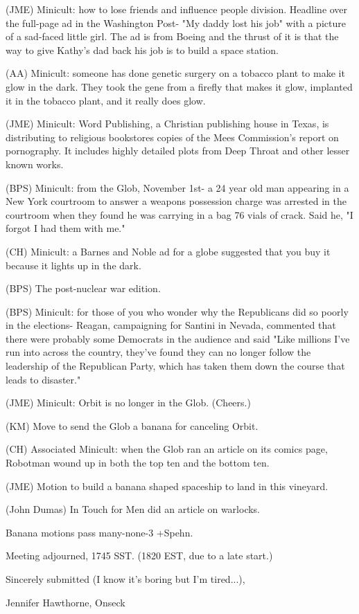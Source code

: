 \documentclass[12pt]{article}
\begin{document}
(JME) Minicult: how to lose friends and influence people division. Headline over the full-page ad in the Washington Post- "My daddy lost his job" with a picture of a sad-faced little girl. The ad is from Boeing and the thrust of it is that the way to give Kathy's dad back his job is to build a space station.

(AA) Minicult: someone has done genetic surgery on a tobacco plant to make it glow in the dark. They took the gene from a firefly that makes it glow, implanted it in the tobacco plant, and it really does glow.

(JME) Minicult: Word Publishing, a Christian publishing house in Texas, is distributing to religious bookstores copies of the Mees Commission's report on pornography. It includes highly detailed plots from Deep Throat and other lesser known works.

(BPS) Minicult: from the Glob, November 1st- a 24 year old man appearing in a New York courtroom to answer a weapons possession charge was arrested in the courtroom when they found he was carrying in a bag 76 vials of crack. Said he, "I forgot I had them with me."

(CH) Minicult: a Barnes and Noble ad for a globe suggested that you buy it because it lights up in the dark.

(BPS) The post-nuclear war edition.

(BPS) Minicult: for those of you who wonder why the Republicans did so poorly in the elections- Reagan, campaigning for Santini in Nevada, commented that there were probably some Democrats in the audience and said "Like millions I've run into across the country, they've found they can no longer follow the leadership of the Republican Party, which has taken them down the course that leads to disaster."

(JME) Minicult: Orbit is no longer in the Glob. (Cheers.)

(KM) Move to send the Glob a banana for canceling Orbit.

(CH) Associated Minicult: when the Glob ran an article on its comics page, Robotman wound up in both the top ten and the bottom ten.

(JME) Motion to build a banana shaped spaceship to land in this vineyard.

(John Dumas) In Touch for Men did an article on warlocks.

Banana motions pass many-none-3 +Spehn.

\vspace{12pt}

\noindent
Meeting adjourned, 1745 SST. (1820 EST, due to a late start.)

\vspace{18pt}

\centerline{Sincerely submitted (I know it's boring but I'm tired...),}
\centerline{Jennifer Hawthorne, Onseck}
\end{document}
